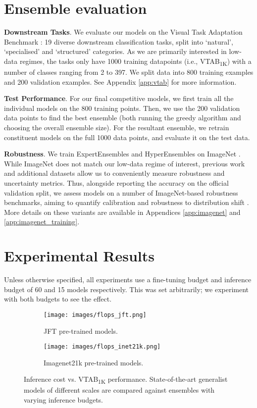 \documentclass{article} \usepackage{iclr2021_conference,times}
\begin{document}
 \section{Ensemble evaluation}
\label{sec:transfer}


\textbf{Downstream Tasks}.
We evaluate our models on the Visual Task Adaptation Benchmark \citep{zhai2019largescale}: 19 diverse downstream classification tasks, split into `natural', `specialised' and `structured' categories.
As we are primarily interested in low-data regimes, the tasks only have 1000 training datapoints (i.e., VTAB\textsubscript{1K}) with a number of classes ranging from 2 to 397.
We split data into 800 training examples and 200 validation examples.
See Appendix \ref{app:vtab} for more information.

\textbf{Test Performance}.
For our final competitive models, we first train all the individual models on the 800 training points.
Then, we use the 200 validation data points to find the best ensemble (both running the greedy algorithm and choosing the overall ensemble size). For the resultant ensemble, we retrain constituent models on the full 1000 data points, and evaluate it on the test data.




\textbf{Robustness}.
We train ExpertEnsembles and HyperEnsembles on ImageNet \citep{deng2009imagenet}. While ImageNet does not match our low-data regime of interest, previous work and additional datasets allow us to conveniently measure robustness and uncertainty metrics. 
Thus, alongside reporting the accuracy on the official validation split, we assess models on a number of ImageNet-based robustness benchmarks, aiming to quantify calibration and robustness to distribution shift \citep{djolonga2020robustness}.
More details on these variants are available in Appendices \ref{app:imagenet} and \ref{app:imagenet_training}. \section{Experimental Results}
\label{sec:experiments}
Unless otherwise specified, all experiments use a fine-tuning budget and inference budget of 60 and 15 models respectively. This was set arbitrarily; we experiment with both budgets to see the effect. 

\begin{figure}[tb]
\centering
\begin{subfigure}{0.60\textwidth}
  \centering
  \texttt{[image: images/flops\_jft.png]}
  \caption{JFT pre-trained models.}
  \label{fig:flops_jft}
\end{subfigure}\hfill
\begin{subfigure}{.37\textwidth}
  \centering
  \texttt{[image: images/flops\_inet21k.png]}
  \caption{Imagenet21k pre-trained models.}
  \label{fig:flops_inet21k}
\end{subfigure}
\caption{Inference cost vs. VTAB\textsubscript{1K} performance. 
State-of-the-art generalist models of different scales are compared against ensembles with varying inference budgets.}
\label{fig:flops}
\end{figure}
\end{document}
